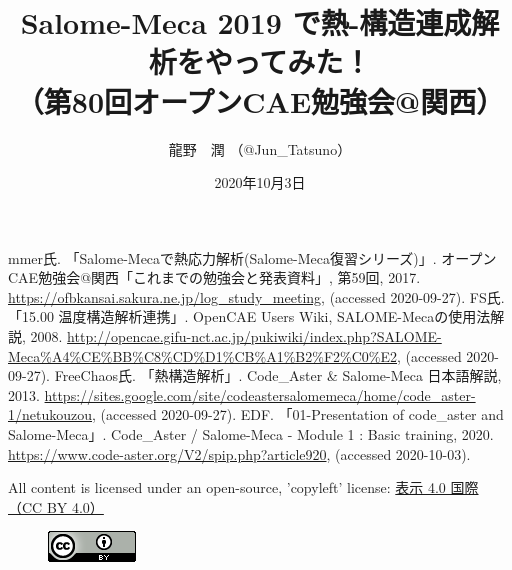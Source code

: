 \documentclass[a4j,20pt,slide]{ltjsarticle}
\title{Salome-Meca 2019 で熱-構造連成解析をやってみた！\\（第80回オープンCAE勉強会@関西）}
\author{龍野　潤 （@Jun\_Tatsuno）}
\date{2020年10月3日}
\begin{document}
\maketitle
\thispagestyle{plain}
\tableofcontents
%


%
\clearpage
\begin{thebibliography}{9}
	 mmer氏. 「Salome-Mecaで熱応力解析(Salome-Meca復習シリーズ)」. オープンCAE勉強会@関西「これまでの勉強会と発表資料」, 第59回, 2017. \href{https://ofbkansai.sakura.ne.jp/log_study_meeting}{https://ofbkansai.sakura.ne.jp/log\_study\_meeting}, (accessed 2020-09-27).
	 FS氏. 「15.00 温度構造解析連携」. OpenCAE Users Wiki, SALOME-Mecaの使用法解説, 2008. \href{http://opencae.gifu-nct.ac.jp/pukiwiki/index.php?SALOME-Meca%A4%CE%BB%C8%CD%D1%CB%A1%B2%F2%C0%E2}{http://opencae.gifu-nct.ac.jp/pukiwiki/index.php?SALOME-Meca\%A4\%CE\%BB\%C8\%CD\%D1\%CB\%A1\%B2\%F2\%C0\%E2}, (accessed 2020-09-27).
	 FreeChaos氏. 「熱構造解析」. Code\_Aster & Salome-Meca 日本語解説, 2013. \href{https://sites.google.com/site/codeastersalomemeca/home/code_aster-1/netukouzou}{https://sites.google.com/site/codeastersalomemeca/home/code\_aster-1/netukouzou}, (accessed 2020-09-27).
	 EDF. 「01-Presentation of code\_aster and Salome-Meca」. Code\_Aster / Salome-Meca - Module 1 : Basic training, 2020. \href{https://www.code-aster.org/V2/spip.php?article920}{https://www.code-aster.org/V2/spip.php?article920}, (accessed 2020-10-03).
\end{thebibliography}
\vspace{2\baselineskip}
All content is licensed under an open-source, 'copyleft' license: \href{https://creativecommons.org/licenses/by/4.0/deed.ja}{表示 4.0 国際 （CC BY 4.0）}
\begin{figure}[htbp]
	\centering
	\includegraphics{fig/license.png}
\end{figure}
\end{document}
